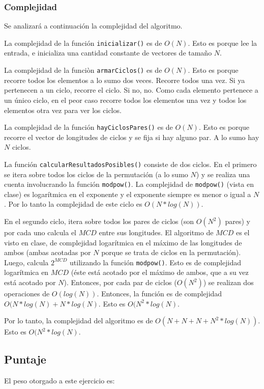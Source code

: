 
\subsubsection{Complejidad}

Se analizará a continuación la complejidad del algoritmo.

La complejidad de la función \texttt{inicializar()} es de $O(N)$. Esto es porque lee la entrada, e inicializa una cantidad constante de vectores de tamaño $N$.

La complejidad de la funciòn \texttt{armarCiclos()} es de $O(N)$. Esto es porque recorre todos los elementos a lo sumo dos veces. Recorre todos una vez. Si ya pertenecen a un ciclo, recorre el ciclo. Si no, no. Como cada elemento pertenece a un único ciclo, en el peor caso recorre todos los elementos una vez y todos los elementos otra vez para ver los ciclos.

La complejidad de la función \texttt{hayCiclosPares()} es de $O(N)$. Esto es porque recorre el vector de longitudes de ciclos y se fija si hay alguno par. A lo sumo hay $N$ ciclos.

La función \texttt{calcularResultadosPosibles()} consiste de dos ciclos. En el primero se itera sobre todos los ciclos de la permutación (a lo sumo $N$) y se realiza una cuenta involucrando la función \texttt{modpow()}. La complejidad de \texttt{modpow()} (vista en clase) es logarítmica en el exponente y el exponente siempre es menor o igual a $N$. Por lo tanto la complejidad de este ciclo es $O(N*log(N))$.

En el segundo ciclo, itera sobre todos los pares de ciclos (son $O(N^2)$ pares) y por cada uno calcula el $MCD$ entre sus longitudes. El algoritmo de $MCD$ es el visto en clase, de complejidad logarítmica en el máximo de las longitudes de ambos (ambas acotadas por $N$ porque se trata de ciclos en la permutación).
Luego, calcula $2^{MCD}$ utilizando la función \texttt{modpow()}. Esto es de complejidad logarítmica en $MCD$ (éste está acotado por el máximo de ambos, que a su vez está acotado por $N$). Entonces, por cada par de ciclos ($O(N^2)$) se realizan dos operaciones de $O(log(N))$. Entonces, la función es de complejidad $O(N*log(N) + N*log(N)$. Esto es $O(N^2*log(N)$.

Por lo tanto, la complejidad del algoritmo es de $O(N + N + N + N^2*log(N))$. Esto es $O(N^2*log(N)$.

\subsection{Puntaje}
El peso otorgado a este ejercicio es:
